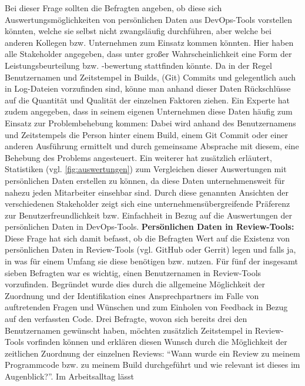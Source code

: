 Bei dieser Frage sollten die Befragten angeben, ob diese sich Auswertungsmöglichkeiten von persönlichen Daten aus DevOps-Tools vorstellen könnten, welche sie selbst nicht zwangsläufig durchführen, aber welche bei anderen Kollegen bzw. Unternehmen
zum Einsatz kommen könnten. Hier haben alle Stakeholder angegeben, dass unter großer Wahrscheinlichkeit eine Form der Leistungsbeurteilung bzw. -bewertung stattfinden könnte. Da in der Regel Benutzernamen und Zeitstempel in Builds, (Git) Commits und gelegentlich auch in Log-Dateien vorzufinden sind, könne man
anhand dieser Daten Rückschlüsse auf die Quantität und Qualität der einzelnen Faktoren ziehen. \newline Ein Experte hat zudem angegeben, dass in seinem eigenen Unternehmen diese Daten häufig zum Einsatz zur Problembehebung kommen: Dabei wird anhand des Benutzernamens und Zeitstempels die Person hinter einem Build,
einem Git Commit oder einer anderen Ausführung ermittelt und durch gemeinsame Absprache mit diesem, eine Behebung des Problems angesteuert. \newline Ein weiterer hat zusätzlich erläutert, Statistiken (vgl. \ref{fig:auswertungen}) zum Vergleichen dieser Auswertungen mit persönlichen Daten erstellen zu können, da diese Daten unternehmensweit
für nahezu jeden Mitarbeiter einsehbar sind. \newline Durch diese genannten Ansichten der verschiedenen Stakeholder zeigt sich eine unternehmensübergreifende Präferenz zur Benutzerfreundlichkeit bzw. Einfachheit in Bezug auf die Auswertungen der persönlichen Daten in DevOps-Tools. \newline \newline
\textbf{Persönlichen Daten in Review-Tools:} \newline
Diese Frage hat sich damit befasst, ob die Befragten Wert auf die Existenz von persönlichen Daten in Review-Tools (vgl. GitHub oder Gerrit) legen und falls ja, in was für einem Umfang sie diese benötigen bzw. nutzen. Für fünf der insgesamt sieben Befragten war es wichtig, einen Benutzernamen in
Review-Tools vorzufinden. Begründet wurde dies durch die allgemeine Möglichkeit der Zuordnung und der Identifikation eines Ansprechpartners im Falle von auftretenden Fragen und Wünschen und zum Einholen von Feedback in Bezug auf den verfassten Code. Drei Befragte, wovon sich bereits drei den Benutzernamen
gewünscht haben, möchten zusätzlich Zeitstempel in Review-Tools vorfinden können und erklären diesen Wunsch durch die Möglichkeit der zeitlichen Zuordnung der einzelnen Reviews: \enquote{Wann wurde ein Review zu meinem Programmcode bzw. zu meinem Build durchgeführt und wie relevant ist dieses im Augenblick?}. Im Arbeitsalltag lässt
